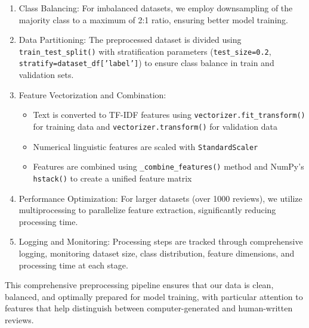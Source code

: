 \begin{enumerate}
    \item Class Balancing: For imbalanced datasets, we employ downsampling of the majority class to a maximum of 2:1 ratio, ensuring better model training.

    \item Data Partitioning: The preprocessed dataset is divided using \texttt{train\_test\_split()} with stratification parameters (\texttt{test\_size=0.2}, \texttt{stratify=dataset\_df['label']}) to ensure class balance in train and validation sets.

    \item Feature Vectorization and Combination:
    \begin{itemize}
        \item Text is converted to TF-IDF features using \texttt{vectorizer.fit\_transform()} for training data and \texttt{vectorizer.transform()} for validation data
        \item Numerical linguistic features are scaled with \texttt{StandardScaler}
        \item Features are combined using \texttt{\_combine\_features()} method and NumPy's \texttt{hstack()} to create a unified feature matrix
    \end{itemize}

    \item Performance Optimization: For larger datasets (over 1000 reviews), we utilize multiprocessing to parallelize feature extraction, significantly reducing processing time.

    \item Logging and Monitoring: Processing steps are tracked through comprehensive logging, monitoring dataset size, class distribution, feature dimensions, and processing time at each stage.
\end{enumerate}

This comprehensive preprocessing pipeline ensures that our data is clean, balanced, and optimally prepared for model training, with particular attention to features that help distinguish between computer-generated and human-written reviews. 